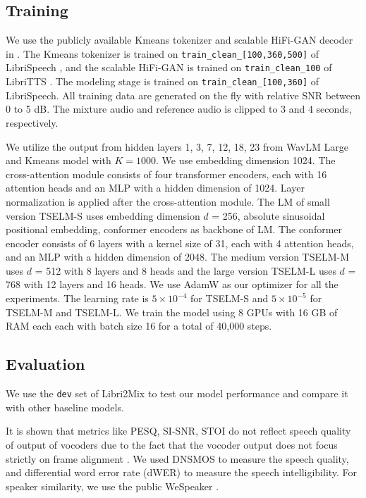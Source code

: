 \documentclass[conference]{IEEEtran}
\begin{document}
\subsection{Training}

We use the publicly available Kmeans tokenizer and scalable 
HiFi-GAN decoder in \cite{speechbrain}. The Kmeans tokenizer
is trained on \texttt{train\_clean\_[100,360,500]} of
LibriSpeech \cite{librispeech}, and the scalable HiFi-GAN is trained on \texttt{train\_clean\_100} of 
LibriTTS \cite{libritts}. The modeling stage is trained on 
\texttt{train\_clean\_[100,360]} of LibriSpeech. All training data are 
generated on the fly with relative SNR between 0 to 5 dB. The mixture audio and reference audio is clipped to 3 and 4 seconds, respectively.

We utilize the output from hidden layers 1, 3, 7, 12, 18, 23 from WavLM Large and Kmeans model with 
\(K=1000\).
We use embedding dimension 1024.  The cross-attention module consists of four transformer encoders, each with 16 attention heads and an MLP with a hidden dimension of 1024. Layer normalization is applied after the cross-attention module.
The LM of small version TSELM-S uses 
embedding dimension \(d\) = 256, absolute sinusoidal positional embedding, conformer encoders as backbone of LM. The conformer encoder consists of 6 layers with a kernel size of 31, each with 4 attention heads, and an MLP with a hidden dimension of 2048. The medium version TSELM-M uses \(d\) = 512 with 8 layers and 8 heads and the large version TSELM-L uses 
\(d\) = 768 with 12 layers and 16 heads. We use AdamW as 
our optimizer for all the experiments. The learning rate 
is \(5 \times 10^{-4}\) for TSELM-S and \(5 \times 10^{-5}\) for TSELM-M and TSELM-L. We train the model using 8 GPUs with 16 GB of RAM each each with batch size 16 for a total of 40,000 steps.


\subsection{Evaluation}
We use the \texttt{dev} set of Libri2Mix \cite{librimix} to test our model performance and compare it with 
other baseline models. 

It is shown that metrics like PESQ, SI-SNR, STOI do not reflect speech quality of output of 
vocoders due to the fact that the vocoder output does not focus strictly on frame alignment
\cite{tokensplit,selm}. We used DNSMOS \cite{dnsmos} to measure the speech quality, and differential 
word error 
rate (dWER) \cite{dwer} to measure the speech intelligibility. For speaker similarity, we use the 
public WeSpeaker \cite{wespeaker}.
\end{document}
